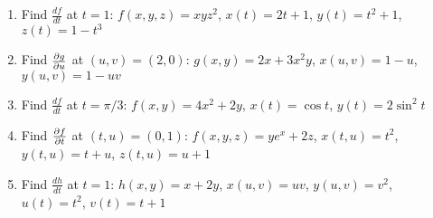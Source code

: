\begin{enumerate}
      \begin{enumerate}
        \item Find $\frac{df}{dt}$ at $t=1$: \newline
          $f(x,y,z)=xyz^2$, $x(t)=2t+1$, $y(t)=t^2+1$, $z(t)=1-t^3$
        \item Find $\frac{\partial g}{\partial u}$ at $(u,v)=(2,0)$: \newline
          $g(x,y)=2x+3x^2y$, $x(u,v)=1-u$, $y(u,v)=1-uv$
        \item Find $\frac{df}{dt}$ at $t=\pi/3$: \newline
          $f(x,y)=4x^2+2y$, $x(t)=\cos t$, $y(t)=2\sin^2 t$
        \item Find $\frac{\partial f}{\partial t}$ at $(t,u)=(0,1)$: \newline
          $f(x,y,z)=ye^x+2z$, $x(t,u)=t^2$, $y(t,u)=t+u$, $z(t,u)=u+1$
        \item Find $\frac{dh}{dt}$ at $t=1$: \newline
          $h(x,y)=x+2y$, $x(u,v)=uv$, $y(u,v)=v^2$, $u(t)=t^2$, $v(t)=t+1$
      \end{enumerate}

    \end{enumerate}



